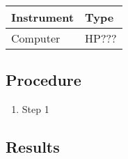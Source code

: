 \begin{table}[H]
\begin{tabular}{|p{10cm}|p{4cm}|}
\hline%
  \textbf{Instrument}                     &  \textbf{Type}       \\
\hline%
  Computer                                &  HP???    \\
\hline %
\end{tabular}
\end{table}

\subsection{Procedure}

\begin{enumerate}
  \item Step 1
\end{enumerate}

\subsection{Results} \label{magnetoCalibrationResults}

